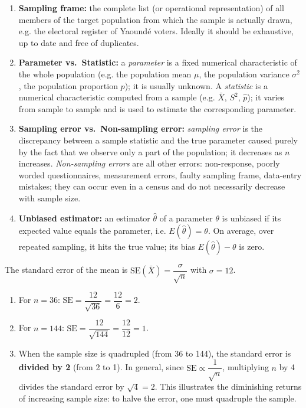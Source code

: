 \documentclass[11pt]{article}
\begin{document}
\begin{corrige}
\begin{enumerate}
\item \textbf{Sampling frame:} the complete list (or operational representation) of all members of the target population from which the sample is actually drawn, e.g. the electoral register of Yaoundé voters. Ideally it should be exhaustive, up to date and free of duplicates.
\item \textbf{Parameter vs.\ Statistic:} a \emph{parameter} is a fixed numerical characteristic of the whole population (e.g. the population mean $\mu$, the population variance $\sigma^2$, the population proportion $p$); it is usually unknown. A \emph{statistic} is a numerical characteristic computed from a sample (e.g. $\bar{X}$, $S^2$, $\hat{p}$); it varies from sample to sample and is used to estimate the corresponding parameter.
\item \textbf{Sampling error vs.\ Non-sampling error:} \emph{sampling error} is the discrepancy between a sample statistic and the true parameter caused purely by the fact that we observe only a part of the population; it decreases as $n$ increases. \emph{Non-sampling errors} are all other errors: non-response, poorly worded questionnaires, measurement errors, faulty sampling frame, data-entry mistakes; they can occur even in a census and do not necessarily decrease with sample size.
\item \textbf{Unbiased estimator:} an estimator $\hat{\theta}$ of a parameter $\theta$ is unbiased if its expected value equals the parameter, i.e. $E(\hat{\theta}) = \theta$. On average, over repeated sampling, it hits the true value; its bias $E(\hat{\theta}) - \theta$ is zero.
\end{enumerate}
\end{corrige}

\begin{corrige}
The standard error of the mean is $\mathrm{SE}(\bar{X}) = \dfrac{\sigma}{\sqrt{n}}$ with $\sigma = 12$.
\begin{enumerate}
\item For $n = 36$: $\mathrm{SE} = \dfrac{12}{\sqrt{36}} = \dfrac{12}{6} = 2$.
\item For $n = 144$: $\mathrm{SE} = \dfrac{12}{\sqrt{144}} = \dfrac{12}{12} = 1$.
\item When the sample size is quadrupled (from 36 to 144), the standard error is \textbf{divided by 2} (from 2 to 1). In general, since $\mathrm{SE} \propto \dfrac{1}{\sqrt{n}}$, multiplying $n$ by 4 divides the standard error by $\sqrt{4} = 2$. This illustrates the diminishing returns of increasing sample size: to halve the error, one must quadruple the sample.
\end{enumerate}
\end{corrige}
\end{document}
